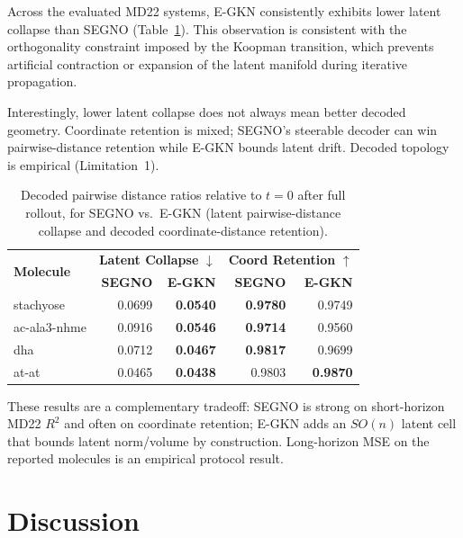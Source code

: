 \documentclass{article}
\begin{document}
Across the evaluated MD22 systems, E-GKN consistently exhibits lower latent collapse than SEGNO (Table~\ref{tab:segno_collapse}). This observation is consistent with the orthogonality constraint imposed by the Koopman transition, which prevents artificial contraction or expansion of the latent manifold during iterative propagation.

Interestingly, lower latent collapse does not always mean better decoded geometry. Coordinate retention is mixed; SEGNO's steerable decoder can win pairwise-distance retention while E-GKN bounds latent drift. Decoded topology is empirical (Limitation~1).

\begin{table}[htbp]
\centering
\begin{tabular}{lrr|rr}
\toprule
\multirow{2}{*}{\textbf{Molecule}} & \multicolumn{2}{c|}{\textbf{Latent Collapse} $\downarrow$} & \multicolumn{2}{c}{\textbf{Coord Retention} $\uparrow$} \\
 & \textbf{SEGNO} & \textbf{E-GKN} & \textbf{SEGNO} & \textbf{E-GKN} \\
\midrule
stachyose & 0.0699 & \textbf{0.0540} & \textbf{0.9780} & 0.9749 \\
ac-ala3-nhme & 0.0916 & \textbf{0.0546} & \textbf{0.9714} & 0.9560 \\
dha & 0.0712 & \textbf{0.0467} & \textbf{0.9817} & 0.9699 \\
at-at & 0.0465 & \textbf{0.0438} & 0.9803 & \textbf{0.9870} \\
\bottomrule
\end{tabular}
\caption{Decoded pairwise distance ratios relative to $t=0$ after full rollout, for SEGNO vs.\ E-GKN (latent pairwise-distance collapse and decoded coordinate-distance retention).}
\label{tab:segno_collapse}
\end{table}

These results are a complementary tradeoff: SEGNO is strong on short-horizon MD22 $R^2$ and often on coordinate retention; E-GKN adds an $SO(n)$ latent cell that bounds latent norm/volume by construction. Long-horizon MSE on the reported molecules is an empirical protocol result.


\section{Discussion}
\label{sec:discussion}
\end{document}
